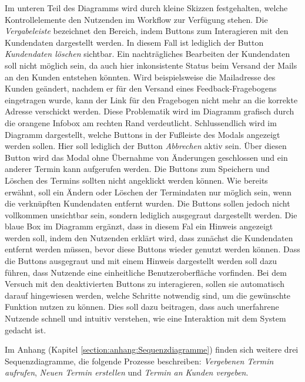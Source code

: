 Im unteren Teil des Diagramms wird durch kleine Skizzen festgehalten, welche
Kontrollelemente den Nutzenden im Workflow zur Verfügung stehen. Die
\textit{Vergabeleiste} bezeichnet den Bereich, indem Buttons zum Interagieren
mit den Kundendaten dargestellt werden. In diesem Fall ist lediglich der Button
\textit{Kundendaten löschen} sichtbar. Ein nachträgliches Bearbeiten der
Kundendaten soll nicht möglich sein, da auch hier inkonsistente Status beim
Versand der Mails an den Kunden entstehen könnten. Wird beispielsweise die
Mailadresse des Kunden geändert, nachdem er für den Versand eines
Feedback-Fragebogens eingetragen wurde, kann der Link für den Fragebogen nicht
mehr an die korrekte Adresse verschickt werden. Diese Problematik wird im
Diagramm grafisch durch die orangene Infobox am rechten Rand verdeutlicht.
Schlussendlich wird im Diagramm dargestellt, welche Buttons in der Fußleiste
des Modals angezeigt werden sollen. Hier soll lediglich der Button
\textit{Abbrechen} aktiv sein. Über diesen Button wird das Modal ohne Übernahme
von Änderungen geschlossen und ein anderer Termin kann aufgerufen werden. Die
Buttons zum Speichern und Löschen des Termins sollten nicht angeklickt werden
können. Wie bereits erwähnt, soll ein Ändern oder Löschen der Termindaten nur
möglich sein, wenn die verknüpften Kundendaten entfernt wurden. Die Buttons
sollen jedoch nicht vollkommen unsichtbar sein, sondern lediglich ausgegraut
dargestellt werden. Die blaue Box im Diagramm ergänzt, dass in diesem Fal ein
Hinweis angezeigt werden soll, indem den Nutzenden erklärt wird, dass zunächst
die Kundendaten entfernt werden müssen, bevor diese Buttons wieder genutzt
werden können. Dass die Buttons ausgegraut und mit einem Hinweis dargestellt
werden soll dazu führen, dass Nutzende eine einheitliche Benutzeroberfläche
vorfinden. Bei dem Versuch mit den deaktivierten Buttons zu interagieren,
sollen sie automatisch darauf hingewiesen werden, welche Schritte notwendig
sind, um die gewünschte Funktion nutzen zu können. Dies soll dazu beitragen,
dass auch unerfahrene Nutzende schnell und intuitiv verstehen, wie eine
Interaktion mit dem System gedacht ist.

Im Anhang (Kapitel \ref{section:anhang:Sequenzdiagramme}) finden sich weitere
drei Sequenzdiagramme, die folgende Prozesse beschreiben: \textit{Vergebenen
    Termin aufrufen}, \textit{Neuen Termin erstellen} und \textit{Termin an Kunden
    vergeben}.

